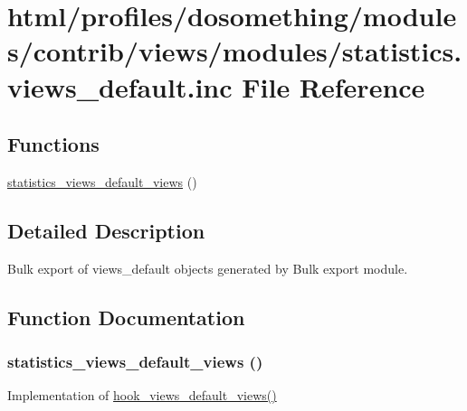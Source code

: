 \hypertarget{statistics_8views__default_8inc}{
\section{html/profiles/dosomething/modules/contrib/views/modules/statistics.views\_\-default.inc File Reference}
\label{statistics_8views__default_8inc}
}
\subsection*{Functions}
\begin{DoxyCompactItemize}
\item 
\hyperlink{statistics_8views__default_8inc_a2560285ba5736526a07b94a2aa0e4621}{statistics\_\-views\_\-default\_\-views} ()
\end{DoxyCompactItemize}


\subsection{Detailed Description}
Bulk export of views\_\-default objects generated by Bulk export module. 

\subsection{Function Documentation}
\hypertarget{statistics_8views__default_8inc_a2560285ba5736526a07b94a2aa0e4621}{
\subsubsection[{statistics\_\-views\_\-default\_\-views}]{\setlength{\rightskip}{0pt plus 5cm}statistics\_\-views\_\-default\_\-views ()}}
\label{statistics_8views__default_8inc_a2560285ba5736526a07b94a2aa0e4621}
Implementation of \hyperlink{group__views__hooks_ga23edb74860682fa88f75cf94b97c2e15}{hook\_\-views\_\-default\_\-views()} 